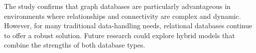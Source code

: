 The study confirms that graph databases are particularly advantageous in environments where relationships and connectivity are complex and dynamic. However, for many traditional data-handling needs, relational databases continue to offer a robust solution. Future research could explore hybrid models that combine the strengths of both database types.
